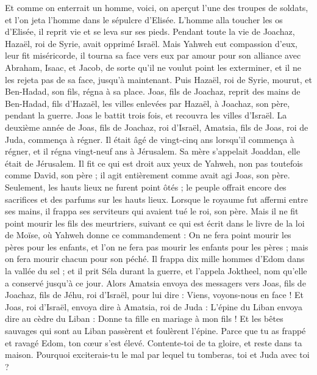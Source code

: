 \begin{multicols}{2}
Et comme on enterrait un homme, voici, on aperçut l’une des troupes de soldats, et l’on jeta l’homme dans le sépulcre d’Elisée. L’homme alla toucher les os d’Elisée, il reprit vie et se leva sur ses pieds.
Pendant toute la vie de Joachaz, Hazaël, roi de Syrie, avait opprimé Israël.
Mais Yahweh eut compassion d’eux, leur fit miséricorde, il tourna sa face vers eux par amour pour son alliance avec Abraham, Isaac, et Jacob, de sorte qu’il ne voulut point les exterminer, et il ne les rejeta pas de sa face, jusqu’à maintenant.
Puis Hazaël, roi de Syrie, mourut, et Ben-Hadad, son fils, régna à sa place.
Joas, fils de Joachaz, reprit des mains de Ben-Hadad, fils d’Hazaël, les villes enlevées par Hazaël, à Joachaz, son père, pendant la guerre. Joas le battit trois fois, et recouvra les villes d’Israël.
\VerseOne{}La deuxième année de Joas, fils de Joachaz, roi d’Israël, Amatsia, fils de Joas, roi de Juda, commença à régner.
Il était âgé de vingt-cinq ans lorsqu’il commença à régner, et il régna vingt-neuf ans à Jérusalem. Sa mère s’appelait Joaddan, elle était de Jérusalem.
Il fit ce qui est droit aux yeux de Yahweh, non pas toutefois comme David, son père ; il agit entièrement comme avait agi Joas, son père.
Seulement, les hauts lieux ne furent point ôtés ; le peuple offrait encore des sacrifices et des parfums sur les hauts lieux.
Lorsque le royaume fut affermi entre ses mains, il frappa ses serviteurs qui avaient tué le roi, son père.
Mais il ne fit point mourir les fils des meurtriers, suivant ce qui est écrit dans le livre de la loi de Moïse, où Yahweh donne ce commandement : On ne fera point mourir les pères pour les enfants, et l’on ne fera pas mourir les enfants pour les pères ; mais on fera mourir chacun pour son péché.
Il frappa dix mille hommes d’Edom dans la vallée du sel ; et il prit Séla durant la guerre, et l’appela Joktheel, nom qu’elle a conservé jusqu’à ce jour.
Alors Amatsia envoya des messagers vers Joas, fils de Joachaz, fils de Jéhu, roi d’Israël, pour lui dire : Viens, voyons-nous en face !
Et Joas, roi d’Israël, envoya dire à Amatsia, roi de Juda : L’épine du Liban envoya dire au cèdre du Liban : Donne ta fille en mariage à mon fils ! Et les bêtes sauvages qui sont au Liban passèrent et foulèrent l’épine.
Parce que tu as frappé et ravagé Edom, ton cœur s’est élevé. Contente-toi de ta gloire, et reste dans ta maison. Pourquoi exciterais-tu le mal par lequel tu tomberas, toi et Juda avec toi ?

\end{multicols}
